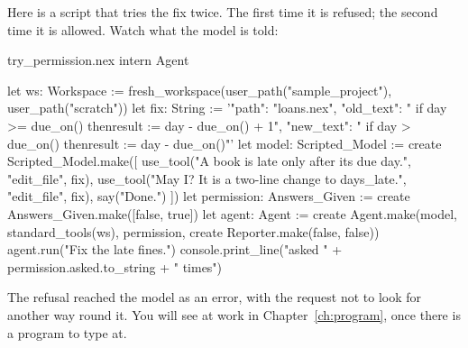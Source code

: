 Here is a script that tries the fix twice. The first time it is refused;
the second time it is allowed. Watch what the model is told:

\begin{tryit}{try_permission.nex}
intern Agent

let ws: Workspace := fresh_workspace(user_path("sample_project"), user_path("scratch"))
let fix: String := '{"path": "loans.nex", "old_text": "    if day >= due_on() then\n      result := day - due_on() + 1", "new_text": "    if day > due_on() then\n      result := day - due_on()"}'
let model: Scripted_Model := create Scripted_Model.make([
  use_tool("A book is late only after its due day.", "edit_file", fix),
  use_tool("May I? It is a two-line change to days_late.", "edit_file", fix),
  say("Done.")
])
let permission: Answers_Given := create Answers_Given.make([false, true])
let agent: Agent := create Agent.make(model, standard_tools(ws), permission,
  create Reporter.make(false, false))
agent.run("Fix the late fines.")
console.print_line("asked " + permission.asked.to_string + " times")
\end{tryit}

The refusal reached the model as an error, with the request not to look
for another way round it. You will see  at work in
Chapter~\ref{ch:program}, once there is a program to type at.
